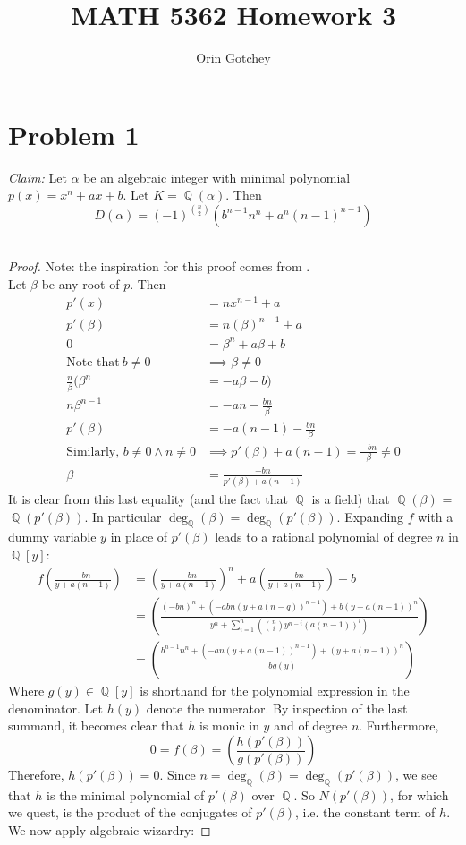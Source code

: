 \documentclass{article}
\DeclareMathOperator{\Q}{\mathbb{Q}}
\begin{document}
	\title{MATH 5362 Homework 3}
	\author{Orin Gotchey}
	\maketitle
	\section*{Problem 1}
		\textit{Claim:} Let $\alpha$ be an algebraic integer with minimal polynomial $p(x) = x^n+ax+b$.  Let $K=\Q(\alpha)$. Then 
		$$D(\alpha) = (-1)^{n\choose 2}(b^{n-1}n^n+a^n(n-1)^{n-1})$$\
\begin{proof}
	Note: the inspiration for this proof comes from \cite[2.35]{milneANT}.\\
	Let $\beta$ be any root of $p$.  Then 
	\begin{align*}
	p'(x) &= nx^{n-1}+a\\
	p'(\beta) &= n(\beta)^{n-1}+a\\
	0 &= \beta^n+a\beta+b\\
	\text{Note that} \  b\neq 0&\implies \beta\neq 0\\
	\frac{n}{\beta}(\beta^n &= -a\beta-b )\\
	n\beta^{n-1} &= -an-\frac{bn}{\beta}\\
	p'(\beta) &= -a(n-1)-\frac{bn}{\beta}\\
	\text{Similarly, } b\neq 0\land n\neq 0 &\implies p'(\beta)+a(n-1) = \frac{-bn}{\beta}\neq 0\\
	\beta &= \frac{-bn}{p'(\beta)+a(n-1)}
	\end{align*}
	It is clear from this last equality (and the fact that $\Q$ is a field) that $\Q(\beta)$ = $\Q(p'(\beta))$.  In particular $\deg_{\Q}{(\beta)} = \deg_{\Q}(p'(\beta))$.  Expanding $f$ with a dummy variable $y$ in place of $p'(\beta)$ leads to a rational polynomial of degree $n$ in $\Q[y]$: \begin{align*}
	f\left(\frac{-bn}{y+a(n-1)}\right) &= \left(\frac{-bn}{y+a(n-1)}\right)^n+a\left(\frac{-bn}{y+a(n-1)}\right)+b\\
	&= \left(\frac{(-bn)^n+(-abn(y+a(n-q))^{n-1})+b(y+a(n-1))^n}{y^n+\sum_{i=1}^n({n\choose i}y^{n-i}(a(n-1))^{i})}\right)\\
	&= \left(\frac{b^{n-1}n^n+(-an(y+a(n-1))^{n-1})+(y+a(n-1))^n}{bg(y)}\right)
	\end{align*} Where $g(y)\in\Q[y]$ is shorthand for the polynomial expression in the denominator. Let $h(y)$ denote the numerator.  By inspection of the last summand, it becomes clear that $h$ is monic in $y$ and of degree $n$.  Furthermore, $$0=f(\beta) = \left(\frac{h(p'(\beta))}{g(p'(\beta))}\right)$$Therefore, $h(p'(\beta))=0$.  Since $n =\deg_{\Q}(\beta)=\deg_{\Q}(p'(\beta))$, we see that $h$ is the minimal polynomial of $p'(\beta)$ over $\Q$.  So $N(p'(\beta))$, for which we quest, is the product of the conjugates of $p'(\beta)$, i.e. the constant term of $h$.  We now apply algebraic wizardry:

\end{proof}
\end{document}
